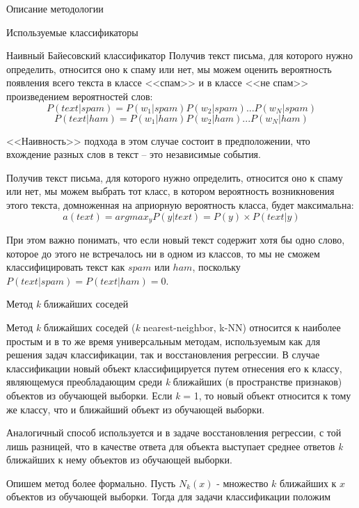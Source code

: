 \begin{section}{Описание методологии}
\begin{subsection}{Используемые классификаторы}
\begin{subsubsection}{Наивный Байесовский классификатор}
Получив текст письма, для которого нужно определить, относится оно к спаму или нет, мы можем оценить вероятность появления всего текста в классе <<спам>> и в классе <<не спам>> произведением вероятностей слов:
\begin{equation}
P(text|spam) = P(w_1|spam)P(w_2|spam)...P(w_N|spam)
\end{equation}
\begin{equation}
P(text|ham) = P(w_1|ham)P(w_2|ham)...P(w_N|ham)
\end{equation}

<<Наивность>> подхода в этом случае состоит в предположении, что вхождение разных слов в текст – это независимые события.

Получив текст письма, для которого нужно определить, относится оно к спаму или нет, мы можем выбрать тот класс, в котором вероятность возникновения этого текста, домноженная на априорную вероятность класса, будет максимальна:
\begin{equation}
a(text) = arg⁡max_{y}⁡ P(y|text) = P(y) \times P(text|y)
\end{equation}

При этом важно понимать, что если новый текст содержит хотя бы одно слово, которое до этого не встречалось ни в одном из классов, то мы не сможем классифицировать текст как $spam$ или $ham$, поскольку $P(text|spam) = P(text|ham) = 0$.

\end{subsubsection}

    \begin{subsubsection}{Метод \textit{k} ближайших соседей}

      Метод \textit{k} ближайших соседей (\textit{k} nearest-neighbor, k-NN) относится к наиболее простым и в то же время универсальным методам, используемым как для решения задач классификации, так и восстановления регрессии. В случае классификации новый объект классифицируется путем отнесения его к классу, являющемуся преобладающим среди \textit{k} ближайших (в пространстве признаков) объектов из обучающей выборки. Если \textit{k} = 1, то новый объект относится к тому же классу, что и ближайший объект из обучающей выборки.

      Аналогичный способ используется и в задаче восстановления регрессии, с той лишь разницей, что в качестве ответа для объекта выступает среднее ответов \textit{k} ближайших к нему объектов из обучающей выборки.

      Опишем метод более формально. Пусть $N_k(x)$ - множество $k$ ближайших к $x$ объектов из обучающей выборки. Тогда для задачи классификации положим


\end{subsubsection}
\end{subsection}
\end{section}
